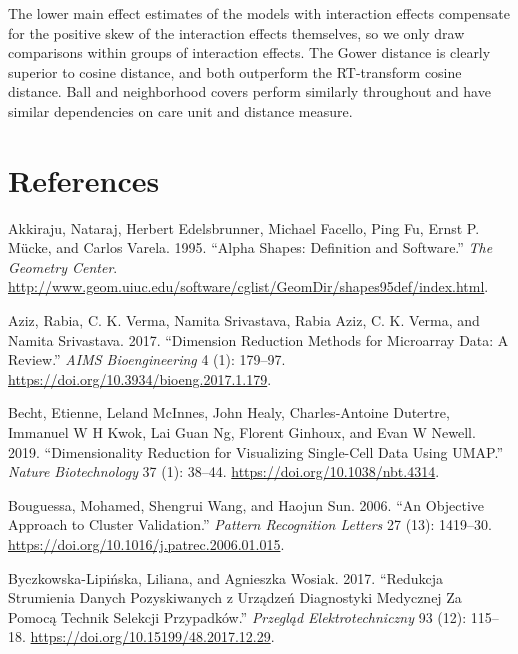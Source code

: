 \documentclass{article}
\newlength{\cslhangindent}
\newlength{\cslentryspacingunit} %
\newenvironment{CSLReferences}[2] %
 {%
  \setlength{\parindent}{0pt}
  \ifodd #1
  \let\oldpar\par
  \def\par{\hangindent=\cslhangindent\oldpar}
  \fi
  \setlength{\parskip}{#2\cslentryspacingunit}
 }%
 {}
\begin{document}
The lower main effect estimates of the models with interaction effects
compensate for the positive skew of the interaction effects themselves,
so we only draw comparisons within groups of interaction effects. The
Gower distance is clearly superior to cosine distance, and both
outperform the RT-transform cosine distance. Ball and neighborhood
covers perform similarly throughout and have similar dependencies on
care unit and distance measure.

\hypertarget{references}{%
\section*{References}\label{references}}

\hypertarget{refs}{}
\begin{CSLReferences}{1}{0}
\leavevmode{}%
Akkiraju, Nataraj, Herbert Edelsbrunner, Michael Facello, Ping Fu, Ernst
P. Mücke, and Carlos Varela. 1995. {``Alpha Shapes: Definition and
Software.''} \emph{The Geometry Center}.
\url{http://www.geom.uiuc.edu/software/cglist/GeomDir/shapes95def/index.html}.

\leavevmode{}%
Aziz, Rabia, C. K. Verma, Namita Srivastava, Rabia Aziz, C. K. Verma,
and Namita Srivastava. 2017. {``Dimension Reduction Methods for
Microarray Data: A Review.''} \emph{AIMS Bioengineering} 4 (1): 179--97.
\url{https://doi.org/10.3934/bioeng.2017.1.179}.

\leavevmode{}%
Becht, Etienne, Leland McInnes, John Healy, Charles-Antoine Dutertre,
Immanuel W H Kwok, Lai Guan Ng, Florent Ginhoux, and Evan W Newell.
2019. {``Dimensionality Reduction for Visualizing Single-Cell Data Using
{UMAP}.''} \emph{Nature Biotechnology} 37 (1): 38--44.
\url{https://doi.org/10.1038/nbt.4314}.

\leavevmode{}%
Bouguessa, Mohamed, Shengrui Wang, and Haojun Sun. 2006. {``An Objective
Approach to Cluster Validation.''} \emph{Pattern Recognition Letters} 27
(13): 1419--30. \url{https://doi.org/10.1016/j.patrec.2006.01.015}.

\leavevmode{}%
Byczkowska-Lipińska, Liliana, and Agnieszka Wosiak. 2017. {``Redukcja
Strumienia Danych Pozyskiwanych z Urządzeń Diagnostyki Medycznej Za
Pomocą Technik Selekcji Przypadków.''} \emph{Przegląd Elektrotechniczny}
93 (12): 115--18. \url{https://doi.org/10.15199/48.2017.12.29}.


\end{CSLReferences}
\end{document}
